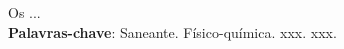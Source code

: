 %
%



\begin{resumo}

\vspace*{12pt}

\begin{SingleSpacing} 
Os ...
\\

\textbf{Palavras-chave}: Saneante. Físico-química. xxx. xxx.
 
\end{SingleSpacing}
\end{resumo}
